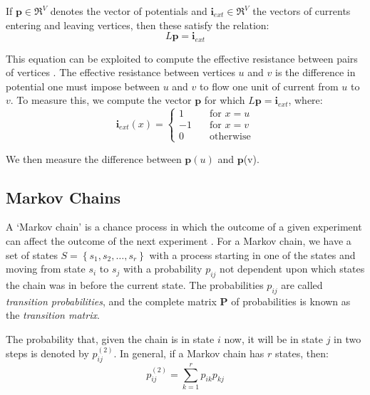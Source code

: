 If $\textbf{p} \in \Re^V$ denotes the vector of potentials and $\textbf{i}_{ext}
\in \Re^V$ the vectors of currents entering and leaving vertices, then these
satisfy the relation:
\begin{equation}
    L\textbf{p} = \textbf{i}_{ext}
\end{equation}

This equation can be exploited to compute the effective resistance between
pairs of vertices \cite{Spielman:2010}. The effective resistance between
vertices $u$ and $v$ is the difference in potential one must impose between $u$
and $v$ to flow one unit of current from $u$ to $v$. To measure this, we compute
the vector $\textbf{p}$ for which $L\textbf{p} = \textbf{i}_{ext}$, where:
\begin{equation}
    \textbf{i}_{ext}(x) =
        \left\{
            \begin{array}{ll}
                1 &     \quad \text{for $x=u$}\\
                -1 &    \quad \text{for $x=v$}\\
                0 &     \quad \text{otherwise}
            \end{array}
        \right.
\end{equation}

We then measure the difference between $\textbf{p}(u)$ and $\textbf{p}$(v).

\subsection{Markov Chains}
\label{markovChains}
A `Markov chain' is a chance process in which the outcome of a given experiment
can affect the outcome of the next experiment \cite{Grinstead:1997}. For a
Markov chain, we have a set of states $S = \left\{s_1,s_2,\ldots,s_r\right\}$
with a process starting in one of the states and moving from state $s_i$ to
$s_j$ with a probability $p_{ij}$ not dependent upon which states the chain was
in before the current state. The probabilities $p_{ij}$ are called
\emph{transition probabilities}, and the complete matrix $\mathbf{P}$ of
probabilities is known as the \emph{transition matrix}.

The probability that, given the chain is in state $i$ now, it will be in state
$j$ in two steps is denoted by $p_{ij}^{(2)}$. In general, if a Markov chain has
$r$ states, then:
\begin{equation}
    p_{ij}^{(2)} = \sum_{k=1}^r p_{ik} p_{kj}
\end{equation}